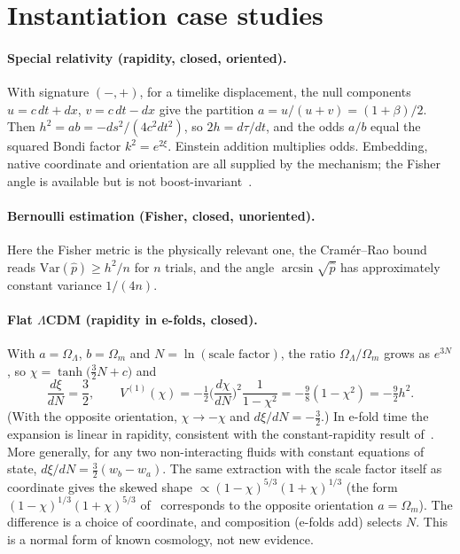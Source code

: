 \documentclass[11pt]{article}
\theoremstyle{definition}
\theoremstyle{remark}
\begin{document}
\section{Instantiation case studies}\label{sec:examples}

\paragraph{Special relativity (rapidity, closed, oriented).} With signature $(-,+)$, for a
timelike displacement,
the null components $u=c\,dt+dx$, $v=c\,dt-dx$ give the partition $a=u/(u+v)=(1+\beta)/2$.
Then $h^2=ab=-ds^2/(4c^2dt^2)$, so $2h=d\tau/dt$, and the odds $a/b$ equal the squared Bondi
factor $k^2=e^{2\xi}$. Einstein addition multiplies odds. Embedding, native coordinate and
orientation are all supplied by the mechanism; the Fisher angle is available but is not
boost-invariant~\cite{DeJesus2026SR}.

\paragraph{Bernoulli estimation (Fisher, closed, unoriented).} Here the Fisher metric is the
physically relevant one, the Cram\'er--Rao bound reads $\mathrm{Var}(\hat p)\ge h^2/n$ for $n$
trials, and the angle $\arcsin\sqrt{\hat p}$ has approximately constant variance $1/(4n)$.

\paragraph{Flat $\Lambda$CDM (rapidity in e-folds, closed).} With
$a=\Omega_\Lambda$, $b=\Omega_m$ and $N=\ln(\text{scale factor})$, the ratio
$\Omega_\Lambda/\Omega_m$ grows as $e^{3N}$, so $\chi=\tanh\big(\tfrac32 N+c\big)$ and
\begin{equation}\label{eq:lcdm}
\frac{d\xi}{dN}=\frac32,\qquad
V^{(1)}(\chi)=-\tfrac12\Big(\frac{d\chi}{dN}\Big)^2\frac{1}{1-\chi^2}=-\tfrac98(1-\chi^2)=-\tfrac92h^2 .
\end{equation}
(With the opposite orientation, $\chi\to-\chi$ and $d\xi/dN=-\tfrac32$.) In e-fold time the
expansion is linear in rapidity, consistent with the constant-rapidity result
of~\cite{DeJesus2026CG}. More generally, for any two non-interacting fluids with constant
equations of state, $d\xi/dN=\tfrac32(w_b-w_a)$. The same extraction with the scale factor
itself as coordinate gives the skewed shape $\propto(1-\chi)^{5/3}(1+\chi)^{1/3}$ (the form
$(1-\chi)^{1/3}(1+\chi)^{5/3}$ of~\cite{DeJesus2026EP} corresponds to the opposite orientation
$a=\Omega_m$). The difference is a choice of coordinate, and composition (e-folds add) selects
$N$. This is a normal form of known cosmology, not new evidence.
\end{document}
